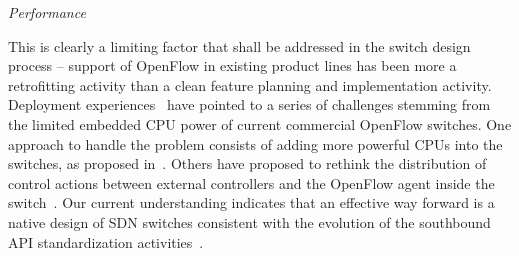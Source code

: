 \vspace{2mm}
\noindent \textit{Performance}

This is clearly a limiting 
factor that shall be addressed in the switch design process -- support of OpenFlow in existing product 
lines has been more a retrofitting activity than a clean feature planning and implementation activity. Deployment experiences~\cite{Kobayashi2014151} have pointed to a series of challenges stemming from the limited embedded CPU power of current commercial OpenFlow switches. 
One approach to handle the problem consists of adding more powerful CPUs into the switches, as proposed 
in~\cite{mogul2012}. Others have proposed to rethink the distribution of control 
actions between external controllers and the OpenFlow agent inside the switch~\cite{curtis2011}. 
Our current understanding indicates that an effective way forward is a native design of SDN switches 
consistent with the evolution of the southbound API standardization activities~\cite{bosshart2013-1,onf2013}. 


